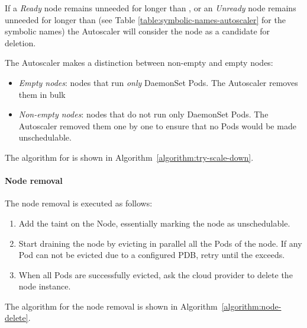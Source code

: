 If a \textit{Ready} node remains unneeded for longer than
, or an \textit{Unready} node remains unneeded for
longer than  (see Table
\ref{table:symbolic-names-autoscaler} for the symbolic names) the Autoscaler
will consider the node as a candidate for deletion.

The Autoscaler makes a distinction between non-empty and empty nodes:
\begin{itemize}
      \tightlist
      \item \textit{Empty nodes}: nodes that run \textit{only} DaemonSet Pods.
            The Autoscaler removes them in bulk
      \item \textit{Non-empty nodes}: nodes that do not run only DaemonSet Pods.
            The Autoscaler removed them one by one to ensure that no Pods would
            be made unschedulable.
\end{itemize}

The algorithm for  is shown in
Algorithm~\ref{algorithm:try-scale-down}.

\paragraph*{Node removal} The node removal is executed as follows:
\begin{enumerate}
      \tightlist
      \item Add the  taint on the
            Node, essentially marking the node as unschedulable.
      \item Start draining the node by evicting in parallel all the Pods of the
            node. If any Pod can not be evicted due to a configured PDB, retry
            until the  exceeds.
      \item When all Pods are successfully evicted, ask the cloud provider to
            delete the node instance.
\end{enumerate}

The algorithm for the node removal is shown in
Algorithm~\ref{algorithm:node-delete}.


\clearpage





\clearpage
